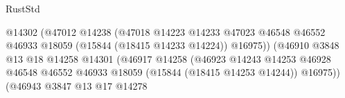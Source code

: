 \begin{lexlean}{RustStd}
\begin{coremodule}
                                                              @14302
                                                              (@47012
                                                                @14238
                                                                (@47018
                                                                  @14223
                                                                  @14233
                                                                  @47023
                                                                  @46548
                                                                  @46552
                                                                  @46933
                                                                  @18059
                                                                  (@15844 (@18415 @14233 @14224))
                                                                  @16975))
                                                              (@46910
                                                                @3848
                                                                @13
                                                                @18
                                                                @14258
                                                                @14301
                                                                (@46917
                                                                  @14258
                                                                  (@46923
                                                                    @14243
                                                                    @14253
                                                                    @46928
                                                                    @46548
                                                                    @46552
                                                                    @46933
                                                                    @18059
                                                                    (@15844 (@18415 @14253 @14244))
                                                                    @16975))
                                                                (@46943
                                                                  @3847
                                                                  @13
                                                                  @17
                                                                  @14278

\end{coremodule}
\end{lexlean}
